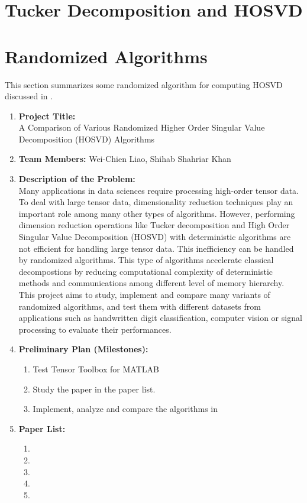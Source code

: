 \documentclass[final]{elsarticle}
\begin{document}
\section{Tucker Decomposition and HOSVD}
\section{Randomized Algorithms}
\noindent This section summarizes some randomized algorithm for computing HOSVD discussed in \cite{9350569}.
\begin{enumerate}
    \item \textbf{Project Title:}\\
    A Comparison of Various Randomized Higher Order Singular Value Decomposition (HOSVD) Algorithms
    \item \textbf{Team Members:} Wei-Chien Liao, Shihab Shahriar Khan
    \item \textbf{Description of the Problem:}\\
    Many applications in data sciences require processing high-order tensor data. To deal
    with large tensor data, dimensionality reduction techniques play an important role among many other types of algorithms. However,
    performing dimension reduction operations like Tucker decomposition and High Order Singular Value Decomposition (HOSVD)
    with deterministic algorithms are not efficient for handling large tensor data. This inefficiency can be
    handled by randomized algorithms. This type of algorithms accelerate classical decompostions by reducing computational complexity
    of deterministic methods and communications among different level of memory hierarchy. This project aims to study, implement and compare
    many variants of randomized algorithms, and test them with different datasets from applications such as handwritten digit classification, computer vision or signal processing 
    to evaluate their performances.
    \item \textbf{Preliminary Plan (Milestones):}
    \begin{enumerate}
        \item Test Tensor Toolbox for MATLAB
        \item Study the paper \cite{9350569} in the paper list.
        \item Implement, analyze and compare the algorithms in \cite{9350569}
    \end{enumerate}
    \item \textbf{Paper List:}
    \begin{enumerate}
        \item[\cite{9350569}] 
        \item[\cite{ma2021fast}] 
        \item[\cite{Brett2021}] 
        \item[\cite{Minster2020}]    
        \item[\cite{Kolda2009}] 
    \end{enumerate}
\end{enumerate}
\end{document}
